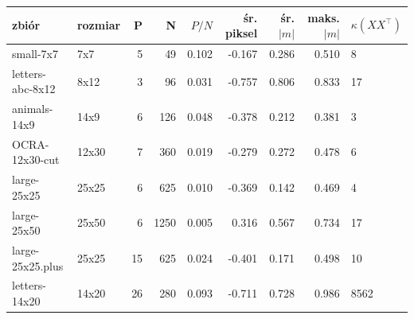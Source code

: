 \begin{tabular}{llrrrrrrl}
\toprule
zbiór & rozmiar & P & N & $P/N$ & śr. piksel & śr. $|m|$ & maks. $|m|$ & $\kappa(XX^\top)$ \\
\midrule
small-7x7 & 7x7 & 5 & 49 & 0.102 & -0.167 & 0.286 & 0.510 & 8 \\
letters-abc-8x12 & 8x12 & 3 & 96 & 0.031 & -0.757 & 0.806 & 0.833 & 17 \\
animals-14x9 & 14x9 & 6 & 126 & 0.048 & -0.378 & 0.212 & 0.381 & 3 \\
OCRA-12x30-cut & 12x30 & 7 & 360 & 0.019 & -0.279 & 0.272 & 0.478 & 6 \\
large-25x25 & 25x25 & 6 & 625 & 0.010 & -0.369 & 0.142 & 0.469 & 4 \\
large-25x50 & 25x50 & 6 & 1250 & 0.005 & 0.316 & 0.567 & 0.734 & 17 \\
large-25x25.plus & 25x25 & 15 & 625 & 0.024 & -0.401 & 0.171 & 0.498 & 10 \\
letters-14x20 & 14x20 & 26 & 280 & 0.093 & -0.711 & 0.728 & 0.986 & 8562 \\
\bottomrule
\end{tabular}
